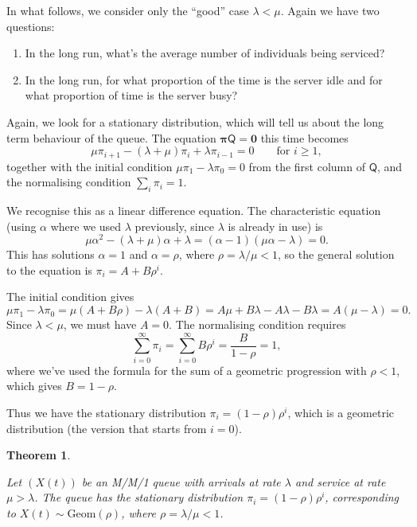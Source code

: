 \documentclass[
  a4paper,
]{article}
\providecommand{\tightlist}{%
  \setlength{\itemsep}{0pt}\setlength{\parskip}{0pt}}
\newtheorem{theorem}{Theorem}[section]
\theoremstyle{definition}
\theoremstyle{definition}
\theoremstyle{definition}
\theoremstyle{remark}
\begin{document}
In what follows, we consider only the ``good'' case \(\lambda < \mu\). Again we have two questions:

\begin{enumerate}
\def\labelenumi{\arabic{enumi}.}
\tightlist
\item
  In the long run, what's the average number of individuals being serviced?
\item
  In the long run, for what proportion of the time is the server idle and for what proportion of time is the server busy?
\end{enumerate}

Again, we look for a stationary distribution, which will tell us about the long term behaviour of the queue. The equation \(\boldsymbol\pi\mathsf Q = \mathbf 0\) this time becomes
\[ \mu \pi_{i+1} - (\lambda + \mu) \pi_i + \lambda \pi_{i-1} = 0 \qquad \text{for $i \geq 1$} , \]
together with the initial condition \(\mu \pi_1 - \lambda \pi_0 = 0\) from the first column of \(\mathsf Q\), and the normalising condition \(\sum_i \pi_i = 1\).

We recognise this as a linear difference equation. The characteristic equation (using \(\alpha\) where we used \(\lambda\) previously, since \(\lambda\) is already in use) is
\[ \mu \alpha^2 - (\lambda + \mu)\alpha + \lambda = (\alpha - 1)(\mu \alpha - \lambda ) = 0 . \]
This has solutions \(\alpha = 1\) and \(\alpha = \rho\), where \(\rho = \lambda/\mu < 1\), so the general solution to the equation is \(\pi_i = A + B\rho^i\).

The initial condition gives
\[  \mu \pi_1 - \lambda \pi_0 = \mu(A + B\rho) - \lambda(A + B) = A\mu + B\lambda - A \lambda - B\lambda = A(\mu - \lambda) = 0 . \]
Since \(\lambda < \mu\), we must have \(A = 0\). The normalising condition requires
\[ \sum_{i=0}^\infty \pi_i = \sum_{i=0}^\infty B\rho^i = \frac{B}{1- \rho} = 1 , \]
where we've used the formula for the sum of a geometric progression with \(\rho < 1\), which gives \(B = 1 - \rho.\)

Thus we have the stationary distribution \(\pi_i = (1 - \rho)\rho^i\),
which is a geometric distribution (the version that starts from \(i = 0\)).

\begin{theorem}
\protect\hypertarget{thm:MMone-thm}{}\label{thm:MMone-thm}

Let \((X(t))\) be an M/M/1 queue with arrivals at rate \(\lambda\) and service at rate \(\mu > \lambda\). The queue has the stationary distribution \(\pi_i = (1 - \rho)\rho^i\), corresponding to \(X(t) \sim \mathrm{Geom}(\rho)\), where \(\rho = \lambda/\mu < 1\).

\end{theorem}
\end{document}
